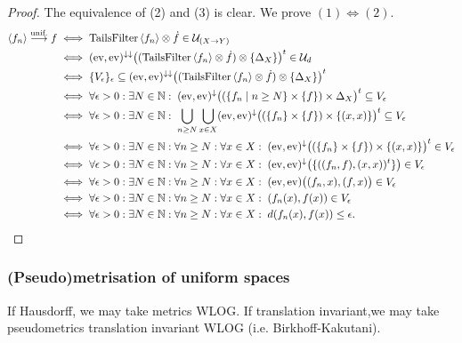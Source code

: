 \begin{proof}
The equivalence of (2) and (3) is clear. We prove $(1) \Leftrightarrow (2)$.
\begin{align*}
\left\langle f_n \right\rangle \overset{\text{unif.}}{\longrightarrow} f &\iff \operatorname{TailsFilter}\left\langle f_n \right\rangle \otimes \dot{f} \in \mathcal{U}_{(X\to Y)} \\
&\iff (\operatorname{ev}, \operatorname{ev})^{\downarrow\downarrow}\big((\operatorname{TailsFilter}\left\langle f_n \right\rangle \otimes \dot{f})\otimes \{\Delta_X\}\big)^t \in \mathcal{U}_d \\
&\iff \{V_\epsilon\}_\epsilon \subseteq (\operatorname{ev}, \operatorname{ev})^{\downarrow\downarrow}\big((\operatorname{TailsFilter}\left\langle f_n \right\rangle \otimes \dot{f})\otimes \{\Delta_X\}\big)^t \\
&\iff \forall \epsilon>0: \exists N\in \mathbb{N}: \; (\operatorname{ev}, \operatorname{ev})^{\downarrow}\big((\left\{ f_n \;\middle|\; n\geq N \right\} \times \{f\})\times \Delta_X\big)^t \subseteq V_\epsilon \\
&\iff \forall \epsilon>0: \exists N\in \mathbb{N}: \; \bigcup_{n\geq N}\bigcup_{x\in X}(\operatorname{ev}, \operatorname{ev})^{\downarrow}\big((\{f_n\} \times \{f\})\times \{(x,x)\}\big)^t \subseteq V_\epsilon \\
&\iff \forall \epsilon>0: \exists N\in \mathbb{N}: \forall n\geq N: \forall x\in X: \;(\operatorname{ev}, \operatorname{ev})^{\downarrow}\big((\{f_n\} \times \{f\})\times \{(x,x)\}\big)^t \in V_\epsilon \\
&\iff \forall \epsilon>0: \exists N\in \mathbb{N}: \forall n\geq N: \forall x\in X: \; (\operatorname{ev}, \operatorname{ev})^{\downarrow}\big(\{((f_n, f), (x,x))^t\}\big) \in V_\epsilon \\
&\iff \forall \epsilon>0: \exists N\in \mathbb{N}: \forall n\geq N: \forall x\in X: \; (\operatorname{ev}, \operatorname{ev})\big((f_n,x),(f,x)\big) \in V_\epsilon \\
&\iff \forall \epsilon>0: \exists N\in \mathbb{N}: \forall n\geq N: \forall x\in X: \; (f_n(x), f(x)) \in V_\epsilon \\
&\iff \forall \epsilon>0: \exists N\in \mathbb{N}: \forall n\geq N: \forall x\in X: \; d(f_n(x), f(x)) \leq \epsilon.
\end{align*}
\end{proof}



\subsubsection{(Pseudo)metrisation of uniform spaces}
If Hausdorff, we may take metrics WLOG. If translation invariant,we may take pseudometrics translation invariant WLOG (i.e. Birkhoff-Kakutani).

